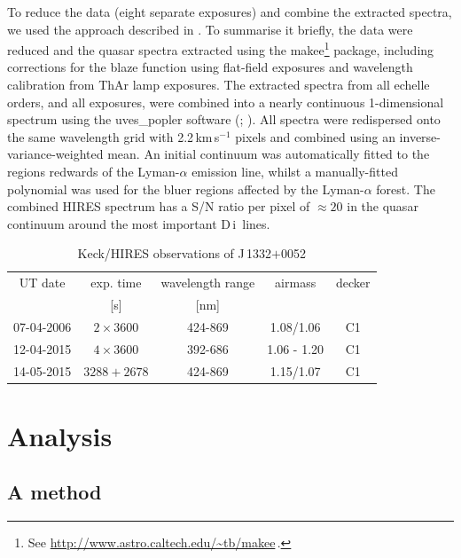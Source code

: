 \documentclass[fleqn,usenatbib]{mnras}
\newcommand{\DI}[0]{D\,{\sc i}}
\newcommand{\q}{J\,1332$+$0052}
\begin{document}
To reduce the data (eight separate exposures) and combine the extracted spectra, we used the approach described in \cite{Robert_2019}. To summarise it briefly, the data were reduced and the quasar spectra extracted using the {\sc makee}\footnote{See \url{http://www.astro.caltech.edu/~tb/makee}\,.} package, including corrections for the blaze function using flat-field exposures and wavelength calibration from ThAr lamp exposures. The extracted spectra from all echelle orders, and all exposures, were combined into a nearly continuous 1-dimensional spectrum using the {\sc uves\_popler} software (\citealt{Murphy_2016}; \citealt{Murphy_2019}). All spectra were redispersed onto the same wavelength grid with 2.2\,km\,s$^{-1}$ pixels and combined using an inverse-variance-weighted mean. An initial continuum was automatically fitted to the regions redwards of the Lyman-$\alpha$ emission line, whilst a manually-fitted polynomial was used for the bluer regions affected by the Lyman-$\alpha$ forest.
The combined HIRES spectrum has a S/N ratio per pixel of $\approx 20$ in the quasar continuum around the most important \DI\ lines.

\begin{table}
\centering
\caption{Keck/HIRES observations of \q}
\label{tab:keck_exposures}
\begin{tabular}{ccccc} 
\hline
UT date    & exp. time       & wavelength range & airmass        & decker \\
           & [s]             &    [nm]          &                &         \\
\hline
07-04-2006 & $2 \times 3600$ & 424-869         & 1.08/1.06      & C1             \\
12-04-2015 & $4 \times 3600$ & 392-686         & 1.06 - 1.20    & C1\\ %
14-05-2015 & $3288+2678$     & 424-869         & 1.15/1.07      & C1             \\
\hline
\end{tabular}
\end{table}

\section{Analysis}
\subsection{A method} %
\label{sect:method}
\end{document}
